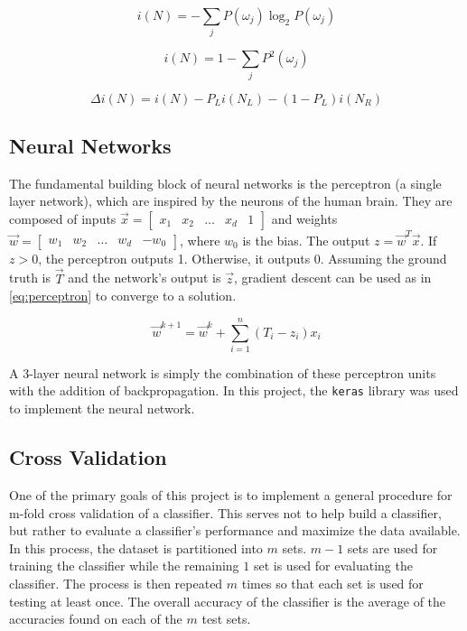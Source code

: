 \documentclass[paper=a4, fontsize=11pt,twoside]{scrartcl}	%
\begin{document}
\begin{equation}
\label{eq:entropy}
i(N) = -\sum_{j}P(\omega_j)\log_2P(\omega_j)
\end{equation}

\begin{equation}
\label{eq:gini}
i(N) = 1 - \sum_{j}P^2(\omega_j)
\end{equation}

\begin{equation}
\label{eq:impuritychange}
\Delta i(N) = i(N) - P_Li(N_L) - (1-P_L)i(N_R)
\end{equation}


\subsection{Neural Networks}
The fundamental building block of neural networks is the perceptron (a single layer network), which are inspired by the neurons of the human brain. They are composed of inputs $\vec{x} = \begin{bmatrix} x_1 & x_2 & \dots & x_d & 1 \end{bmatrix}$ and weights $\vec{w} = \begin{bmatrix} w_1 & w_2 & \dots & w_d & -w_0 \end{bmatrix}$, where $w_0$ is the bias. The output $z=\vec{w}^T\vec{x}$. If $z>0$, the perceptron outputs 1. Otherwise, it outputs 0. Assuming the ground truth is $\vec{T}$ and the network's output is $\vec{z}$, gradient descent can be used as in \eqref{eq:perceptron} to converge to a solution.

\begin{equation}
\label{eq:perceptron}
\vec{w}^{k+1}=\vec{w}^k + \sum_{i=1}^n(T_i-z_i)x_i
\end{equation}

A 3-layer neural network is simply the combination of these perceptron units with the addition of backpropagation. In this project, the \texttt{keras} library was used to implement the neural network.

\subsection{Cross Validation}
One of the primary goals of this project is to implement a general procedure for m-fold cross validation of a classifier. This serves not to help build a classifier, but rather to evaluate a classifier's performance and maximize the data available. In this process, the dataset is partitioned into $m$ sets. $m-1$ sets are used for training the classifier while the remaining $1$ set is used for evaluating the classifier. The process is then repeated $m$ times so that each set is used for testing at least once. The overall accuracy of the classifier is the average of the accuracies found on each of the $m$ test sets.
\end{document}

